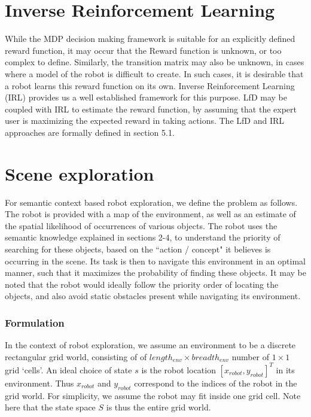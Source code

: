 \section{Inverse Reinforcement Learning}
While the MDP decision making framework is suitable for an explicitly defined reward function, it may occur that the Reward function is unknown, or too complex to define. Similarly, the transition matrix may also be unknown, in cases where a model of the robot is difficult to create. In such cases, it is desirable that a robot learns this reward function on its own. Inverse Reinforcement Learning (IRL) provides us a well established framework for this purpose. LfD may be coupled with IRL  to estimate the reward function, by assuming that the expert user is maximizing the expected reward in taking actions. The LfD and IRL approaches are formally defined in section 5.1. 

\section{Scene exploration}
For semantic context based robot exploration, we define the problem as follows. The robot is provided with a map of the environment, as well as an estimate of the spatial likelihood of occurrences of various objects. The robot uses the semantic knowledge explained in sections 2-4, to understand the priority of searching for these objects, based on the ``action / concept" it believes is occurring in the scene. Its task is then to navigate this environment in an optimal manner, such that it maximizes the probability of finding these objects. It may be noted that the robot would ideally follow the priority order of locating the objects, and also avoid static obstacles present while navigating its environment. 

\subsubsection{Formulation}
In the context of robot exploration, we assume an environment to be a discrete rectangular grid world, consisting of of  $length_{env} \times breadth_{env}$ number of $1 \times 1$ grid `cells'. An ideal choice of state $s$ is the robot location $[x_{robot},y_{robot}]^T$ in its environment. Thus $x_{robot}$ and $y_{robot}$ correspond to the indices of the robot in the grid world. For simplicity, we assume the robot may fit inside one grid cell. Note here that the state space $S$ is thus the entire grid world.\\

